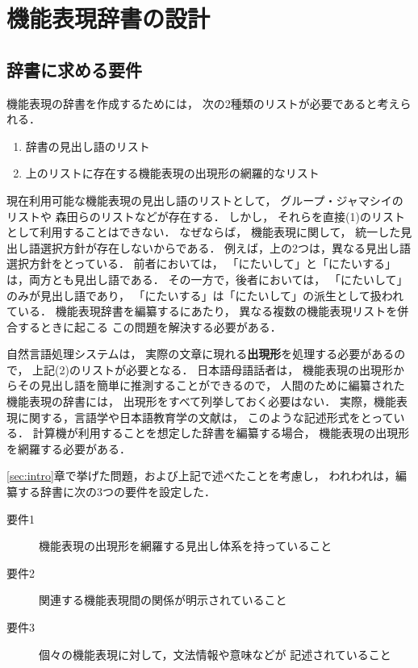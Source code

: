 \documentclass[japanese]{jnlp_1.3e}
\begin{document}
\section{機能表現辞書の設計}

\subsection{辞書に求める要件}
\label{subsec:requirement}

機能表現の辞書を作成するためには，
次の2種類のリストが必要であると考えられる．
\begin{enumerate}
\item 辞書の見出し語のリスト
\item 上のリストに存在する機能表現の出現形の網羅的なリスト
\end{enumerate}

現在利用可能な機能表現の見出し語のリストとして，
グループ・ジャマシイのリストや
森田らのリストなどが存在する．
しかし，
それらを直接(1)のリストとして利用することはできない．
なぜならば，
機能表現に関して，
統一した見出し語選択方針が存在しないからである．
例えば，上の2つは，異なる見出し語選択方針をとっている．
前者においては，
「にたいして」と「にたいする」は，両方とも見出し語である．
その一方で，後者においては，
「にたいして」のみが見出し語であり，
「にたいする」は「にたいして」の派生として扱われている．
機能表現辞書を編纂するにあたり，
異なる複数の機能表現リストを併合するときに起こる
この問題を解決する必要がある．

自然言語処理システムは，
実際の文章に現れる{\bf 出現形}を処理する必要があるので，
上記(2)のリストが必要となる．
日本語母語話者は，
機能表現の出現形からその見出し語を簡単に推測することができるので，
人間のために編纂された機能表現の辞書には，
出現形をすべて列挙しておく必要はない．
実際，機能表現に関する，言語学や日本語教育学の文献は，
このような記述形式をとっている．
計算機が利用することを想定した辞書を編纂する場合，
機能表現の出現形を網羅する必要がある．

\ref{sec:intro}章で挙げた問題，および上記で述べたことを考慮し，
われわれは，編纂する辞書に次の3つの要件を設定した．
\begin{description}
 \item[要件1] 機能表現の出現形を網羅する見出し体系を持っていること
 \item[要件2] 関連する機能表現間の関係が明示されていること
 \item[要件3] 個々の機能表現に対して，文法情報や意味などが
            記述されていること
\end{description}
\end{document}
